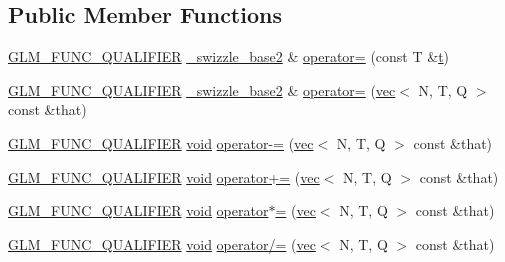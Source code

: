 \subsection*{Public Member Functions}
\begin{DoxyCompactItemize}
\item 
\mbox{\hyperlink{setup_8hpp_a33fdea6f91c5f834105f7415e2a64407}{G\+L\+M\+\_\+\+F\+U\+N\+C\+\_\+\+Q\+U\+A\+L\+I\+F\+I\+ER}} \mbox{\hyperlink{structglm_1_1detail_1_1__swizzle__base2}{\+\_\+swizzle\+\_\+base2}} \& \mbox{\hyperlink{structglm_1_1detail_1_1__swizzle__base2_a48c3cc524e3e408243a1ee4ef42cd90c}{operator=}} (const T \&\mbox{\hyperlink{_s_d_l__opengl_8h_a7d65d00ca3b0630d9b5c52df855b19f5}{t}})
\item 
\mbox{\hyperlink{setup_8hpp_a33fdea6f91c5f834105f7415e2a64407}{G\+L\+M\+\_\+\+F\+U\+N\+C\+\_\+\+Q\+U\+A\+L\+I\+F\+I\+ER}} \mbox{\hyperlink{structglm_1_1detail_1_1__swizzle__base2}{\+\_\+swizzle\+\_\+base2}} \& \mbox{\hyperlink{structglm_1_1detail_1_1__swizzle__base2_a70f9bb1c990a71a55d125abc36c6849b}{operator=}} (\mbox{\hyperlink{structglm_1_1vec}{vec}}$<$ N, T, Q $>$ const \&that)
\item 
\mbox{\hyperlink{setup_8hpp_a33fdea6f91c5f834105f7415e2a64407}{G\+L\+M\+\_\+\+F\+U\+N\+C\+\_\+\+Q\+U\+A\+L\+I\+F\+I\+ER}} \mbox{\hyperlink{_s_d_l__opengles2__gl2ext_8h_ae5d8fa23ad07c48bb609509eae494c95}{void}} \mbox{\hyperlink{structglm_1_1detail_1_1__swizzle__base2_a5e985ec8cbfa38395aa667eea74d2ca0}{operator-\/=}} (\mbox{\hyperlink{structglm_1_1vec}{vec}}$<$ N, T, Q $>$ const \&that)
\item 
\mbox{\hyperlink{setup_8hpp_a33fdea6f91c5f834105f7415e2a64407}{G\+L\+M\+\_\+\+F\+U\+N\+C\+\_\+\+Q\+U\+A\+L\+I\+F\+I\+ER}} \mbox{\hyperlink{_s_d_l__opengles2__gl2ext_8h_ae5d8fa23ad07c48bb609509eae494c95}{void}} \mbox{\hyperlink{structglm_1_1detail_1_1__swizzle__base2_a4c22bf1dde634b274789b630f75af0f1}{operator+=}} (\mbox{\hyperlink{structglm_1_1vec}{vec}}$<$ N, T, Q $>$ const \&that)
\item 
\mbox{\hyperlink{setup_8hpp_a33fdea6f91c5f834105f7415e2a64407}{G\+L\+M\+\_\+\+F\+U\+N\+C\+\_\+\+Q\+U\+A\+L\+I\+F\+I\+ER}} \mbox{\hyperlink{_s_d_l__opengles2__gl2ext_8h_ae5d8fa23ad07c48bb609509eae494c95}{void}} \mbox{\hyperlink{structglm_1_1detail_1_1__swizzle__base2_a41a9fe45545f5adcd0c529c3a426e29f}{operator$\ast$=}} (\mbox{\hyperlink{structglm_1_1vec}{vec}}$<$ N, T, Q $>$ const \&that)
\item 
\mbox{\hyperlink{setup_8hpp_a33fdea6f91c5f834105f7415e2a64407}{G\+L\+M\+\_\+\+F\+U\+N\+C\+\_\+\+Q\+U\+A\+L\+I\+F\+I\+ER}} \mbox{\hyperlink{_s_d_l__opengles2__gl2ext_8h_ae5d8fa23ad07c48bb609509eae494c95}{void}} \mbox{\hyperlink{structglm_1_1detail_1_1__swizzle__base2_ad4ef23a8bcf9b2474f08c5f1960e3fbd}{operator/=}} (\mbox{\hyperlink{structglm_1_1vec}{vec}}$<$ N, T, Q $>$ const \&that)

\end{DoxyCompactItemize}
